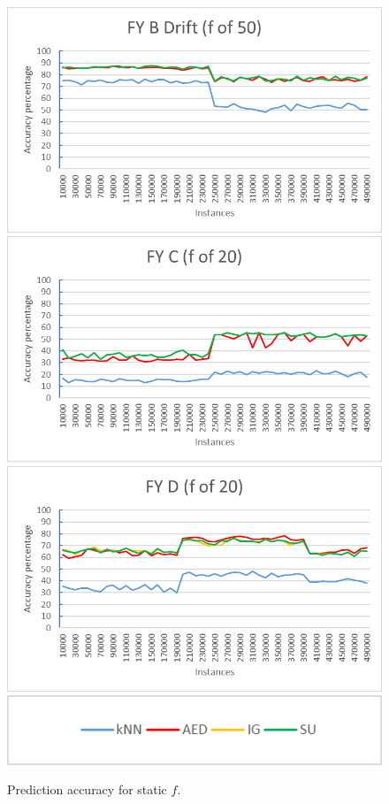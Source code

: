 \begin{figure}[h]
\begin{center}
\includegraphics[scale=0.25]{Graphs/FY_B_Drift/graph}
\includegraphics[scale=0.25]{Graphs/FY_C/graph20}
\includegraphics[scale=0.25]{Graphs/FY_D/graph20}
\includegraphics[scale=0.5]{Graphs/legend}
\caption{Prediction accuracy for static $f$.}
\label{fig:graphs2}
\end{center}
\end{figure}

